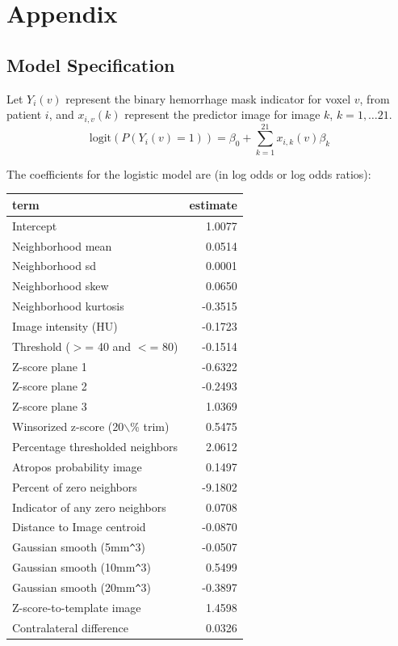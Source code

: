 \documentclass{elsarticle_nonatbib}\usepackage[]{graphicx}\usepackage[]{color}
\begin{document}
\newpage
%
%
%
\printbibliography

\section{Appendix}

\subsection{Model Specification}


Let $Y_{i}(v)$ represent the binary hemorrhage mask indicator for voxel $v$, from patient $i$, and $x_{i,v}(k)$ represent the predictor image for image $k$, $k = 1, \dots 21$.
$$
\text{logit}\left(P(Y_{i}(v) = 1)\right) = \beta_0 + \sum_{k = 1}^{21} x_{i, k}(v)\beta_{k}
$$

The coefficients for the logistic model are (in log odds or log odds ratios):

\begin{table}[ht]
\centering
\begin{tabular}{lr}
  \hline
term & estimate \\ 
  \hline
Intercept & 1.0077 \\ 
  Neighborhood mean & 0.0514 \\ 
  Neighborhood sd & 0.0001 \\ 
  Neighborhood skew & 0.0650 \\ 
  Neighborhood kurtosis & -0.3515 \\ 
  Image intensity (HU) & -0.1723 \\ 
  Threshold ($>$= 40 and $<$= 80) & -0.1514 \\ 
  Z-score plane 1 & -0.6322 \\ 
  Z-score plane 2 & -0.2493 \\ 
  Z-score plane 3 & 1.0369 \\ 
  Winsorized z-score (20$\backslash$\% trim) & 0.5475 \\ 
  Percentage thresholded neighbors & 2.0612 \\ 
  Atropos probability image & 0.1497 \\ 
  Percent of zero neighbors & -9.1802 \\ 
  Indicator of any zero neighbors & 0.0708 \\ 
  Distance to Image centroid & -0.0870 \\ 
  Gaussian smooth (5mm\verb|^|3) & -0.0507 \\ 
  Gaussian smooth (10mm\verb|^|3) & 0.5499 \\ 
  Gaussian smooth (20mm\verb|^|3) & -0.3897 \\ 
  Z-score-to-template image & 1.4598 \\ 
  Contralateral difference & 0.0326 \\ 
   \hline
\end{tabular}
\end{table}
\end{document}
